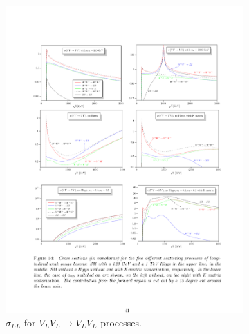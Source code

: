 \begin{figure}[!htb]
  \begin{subfigure}{.49\textwidth}
    \centering
    \includegraphics[width=.99\linewidth]{figures/Theory/VBS_NoHiggs.pdf}  
    \caption{$\sigma_{LL}$ for $V_L V_L \rightarrow V_L V_L$ processes.}
    \label{fig:VBS_XS}
  \end{subfigure}
  \begin{subfigure}{.49\textwidth}
    \centering

\end{subfigure}
\end{figure}
